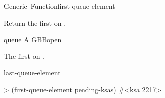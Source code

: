 \documentclass[10pt,twoside,english,pdftex]{article}
\begin{document}

\begin{functiondoc}{Generic~Function}{first-queue-element}{
    \returns{} }
%
%

\fnsyntax

\fnpurpose Return the first  on .

\fnmethods
{}

\fnpackage {}

\fnmodule {}

\fnargs
\begin{args}{queue}
\arg[queue] A GBBopen 
\end{args}

\fnreturns The first  on .
  
\begin{alsos}{last-queue-element}
\end{alsos}

\fnexample
%
\W\supp
\begin{example}
> (first-queue-element pending-ksas)
#<ksa 2217>
\end{example}

\end{functiondoc}

\end{document}
